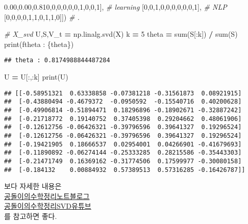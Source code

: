\documentclass[
]{article}
\newenvironment{Shaded}{\begin{snugshade}}{\end{snugshade}}
\newcommand{\BuiltInTok}[1]{#1}
\newcommand{\CommentTok}[1]{\textcolor[rgb]{0.56,0.35,0.01}{\textit{#1}}}
\newcommand{\DecValTok}[1]{\textcolor[rgb]{0.00,0.00,0.81}{#1}}
\newcommand{\NormalTok}[1]{#1}
\newcommand{\OperatorTok}[1]{\textcolor[rgb]{0.81,0.36,0.00}{\textbf{#1}}}
\newcommand{\SpecialCharTok}[1]{\textcolor[rgb]{0.00,0.00,0.00}{#1}}
\newcommand{\SpecialStringTok}[1]{\textcolor[rgb]{0.31,0.60,0.02}{#1}}
\begin{document}
\begin{Shaded}
\begin{Highlighting}[]
\NormalTok{              [}\DecValTok{0}\NormalTok{,}\DecValTok{0}\NormalTok{,}\DecValTok{0}\NormalTok{,}\DecValTok{0}\NormalTok{,}\DecValTok{0}\NormalTok{,}\DecValTok{0}\NormalTok{,}\DecValTok{1}\NormalTok{,}\DecValTok{0}\NormalTok{,}\DecValTok{0}\NormalTok{,}\DecValTok{1}\NormalTok{], }\CommentTok{\# learning}
\NormalTok{              [}\DecValTok{0}\NormalTok{,}\DecValTok{0}\NormalTok{,}\DecValTok{1}\NormalTok{,}\DecValTok{0}\NormalTok{,}\DecValTok{0}\NormalTok{,}\DecValTok{0}\NormalTok{,}\DecValTok{0}\NormalTok{,}\DecValTok{0}\NormalTok{,}\DecValTok{0}\NormalTok{,}\DecValTok{1}\NormalTok{], }\CommentTok{\# NLP}
\NormalTok{              [}\DecValTok{0}\NormalTok{,}\DecValTok{0}\NormalTok{,}\DecValTok{0}\NormalTok{,}\DecValTok{0}\NormalTok{,}\DecValTok{1}\NormalTok{,}\DecValTok{1}\NormalTok{,}\DecValTok{0}\NormalTok{,}\DecValTok{1}\NormalTok{,}\DecValTok{1}\NormalTok{,}\DecValTok{0}\NormalTok{]]) }\CommentTok{\# . }
              
\CommentTok{\# X\_svd}
\NormalTok{U,S,V\_t }\OperatorTok{=}\NormalTok{ np.linalg.svd(X)}
\NormalTok{k }\OperatorTok{=} \DecValTok{5}
\NormalTok{theta }\OperatorTok{=} \BuiltInTok{sum}\NormalTok{(S[:k]) }\OperatorTok{/} \BuiltInTok{sum}\NormalTok{(S)}
\BuiltInTok{print}\NormalTok{(}\SpecialStringTok{f\textquotesingle{}theta : }\SpecialCharTok{\{}\NormalTok{theta}\SpecialCharTok{\}}\SpecialStringTok{\textquotesingle{}}\NormalTok{)}
\end{Highlighting}
\end{Shaded}

\begin{verbatim}
## theta : 0.8174988844487284
\end{verbatim}

\begin{Shaded}
\begin{Highlighting}[]
\NormalTok{U }\OperatorTok{=}\NormalTok{ U[:,:k]}
\BuiltInTok{print}\NormalTok{(U)}
\end{Highlighting}
\end{Shaded}

\begin{verbatim}
## [[-0.58951321  0.63338858 -0.07381218 -0.31561873  0.08921915]
##  [-0.43880494 -0.4679372  -0.0950592  -0.15540716  0.40200628]
##  [-0.49906814 -0.51894471  0.18296896 -0.18902671 -0.32887242]
##  [-0.21718772  0.19140752  0.37405398  0.29204662  0.48061906]
##  [-0.12612756 -0.06426321 -0.39796596  0.39641327  0.19296524]
##  [-0.12612756 -0.06426321 -0.39796596  0.39641327  0.19296524]
##  [-0.19421905  0.18666537  0.02954001  0.04266901 -0.41679693]
##  [-0.11890892 -0.06274144 -0.25333285  0.28215586 -0.35443303]
##  [-0.21471749  0.16369162 -0.31774506  0.17599977 -0.30080158]
##  [-0.184132    0.00884932  0.57389513  0.57316285 -0.16426787]]
\end{verbatim}

보다 자세한 내용은\\
\href{https://angeloyeo.github.io/2019/08/01/SVD.html}{공돌이의수학정리노트블로그}\\
\href{https://www.youtube.com/watch?v=cq5qlYtnLoY\&t=1520s}{공돌이의수학정리SVD유튜브}\\
를 참고하면 좋다.
\end{document}
